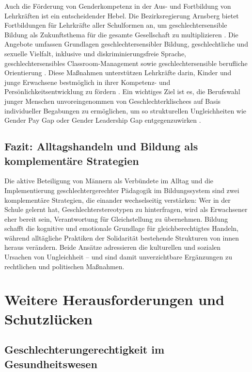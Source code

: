 \documentclass[12pt,a4paper]{article}
\begin{document}
	Auch die Förderung von Genderkompetenz in der Aus- und Fortbildung von Lehrkräften ist ein entscheidender Hebel. Die Bezirksregierung Arnsberg bietet Fortbildungen für Lehrkräfte aller Schulformen an, um geschlechtersensible Bildung als Zukunftsthema für die gesamte Gesellschaft zu multiplizieren \cite{arnsberg_fobi}. Die Angebote umfassen Grundlagen geschlechtersensibler Bildung, geschlechtliche und sexuelle Vielfalt, inklusive und diskriminierungsfreie Sprache, geschlechtersensibles Classroom-Management sowie geschlechtersensible berufliche Orientierung \cite{arnsberg_fobi}. Diese Maßnahmen unterstützen Lehrkräfte darin, Kinder und junge Erwachsene bestmöglich in ihrer Kompetenz- und Persönlichkeitsentwicklung zu fördern \cite{arnsberg_fobi}. Ein wichtiges Ziel ist es, die Berufswahl junger Menschen unvoreingenommen von Geschlechterklischees auf Basis individueller Begabungen zu ermöglichen, um so strukturellen Ungleichheiten wie Gender Pay Gap oder Gender Leadership Gap entgegenzuwirken \cite{muenchen_konzept_artikel}.
	
	\subsection{Fazit: Alltagshandeln und Bildung als komplementäre Strategien}
	
	Die aktive Beteiligung von Männern als Verbündete im Alltag und die Implementierung geschlechtergerechter Pädagogik im Bildungssystem sind zwei komplementäre Strategien, die einander wechselseitig verstärken: Wer in der Schule gelernt hat, Geschlechterstereotypen zu hinterfragen, wird als Erwachsener eher bereit sein, Verantwortung für Gleichstellung zu übernehmen. Bildung schafft die kognitive und emotionale Grundlage für gleichberechtigtes Handeln, während alltägliche Praktiken der Solidarität bestehende Strukturen von innen heraus verändern. Beide Ansätze adressieren die kulturellen und sozialen Ursachen von Ungleichheit – und sind damit unverzichtbare Ergänzungen zu rechtlichen und politischen Maßnahmen.
	
	\section{Weitere Herausforderungen und Schutzlücken}
	
	\subsection{Geschlechterungerechtigkeit im Gesundheitswesen}
	
\end{document}
